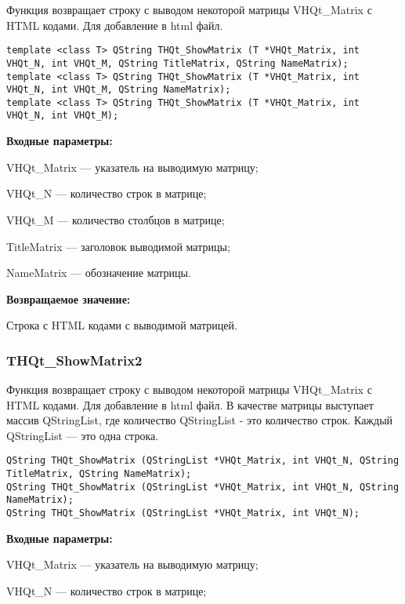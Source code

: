 \documentclass[a4paper,12pt]{article}
\begin{document}
Функция возвращает строку с выводом некоторой матрицы VHQt\_Matrix с HTML кодами. Для добавление в html файл.


\begin{lstlisting}[label=code_syntax_THQt_ShowMatrix,caption=Синтаксис]
template <class T> QString THQt_ShowMatrix (T *VHQt_Matrix, int VHQt_N, int VHQt_M, QString TitleMatrix, QString NameMatrix);
template <class T> QString THQt_ShowMatrix (T *VHQt_Matrix, int VHQt_N, int VHQt_M, QString NameMatrix);
template <class T> QString THQt_ShowMatrix (T *VHQt_Matrix, int VHQt_N, int VHQt_M);
\end{lstlisting}

\textbf{Входные параметры:}
 
    VHQt\_Matrix --- указатель на выводимую матрицу;
 
    VHQt\_N --- количество строк в матрице;
 
    VHQt\_M --- количество столбцов в матрице;
 
    TitleMatrix --- заголовок выводимой матрицы;
 
    NameMatrix --- обозначение матрицы.

\textbf{Возвращаемое значение:}

Строка с HTML кодами с выводимой матрицей.


\subsubsection{THQt\_ShowMatrix2}\label{THQt_ShowMatrix2}

Функция возвращает строку с выводом некоторой матрицы VHQt\_Matrix с HTML кодами. Для добавление в html файл. В качестве матрицы выступает массив QStringList, где количество QStringList - это количество строк. Каждый QStringList --- это одна строка.


\begin{lstlisting}[label=code_syntax_THQt_ShowMatrix2,caption=Синтаксис]
QString THQt_ShowMatrix (QStringList *VHQt_Matrix, int VHQt_N, QString TitleMatrix, QString NameMatrix);
QString THQt_ShowMatrix (QStringList *VHQt_Matrix, int VHQt_N, QString NameMatrix);
QString THQt_ShowMatrix (QStringList *VHQt_Matrix, int VHQt_N);
\end{lstlisting}

\textbf{Входные параметры:}

    VHQt\_Matrix --- указатель на выводимую матрицу;
 
    VHQt\_N --- количество строк в матрице;
 
\end{document}
